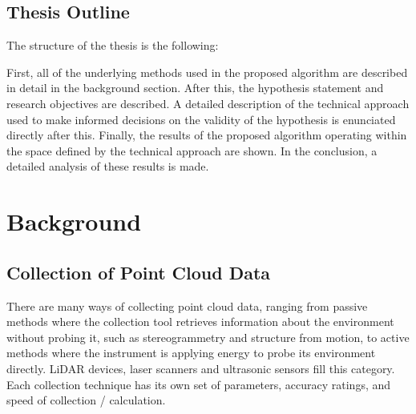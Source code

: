 \documentclass[12pt]{drexelthesis}
\let\Oldsection\section
\renewcommand{\section}{\FloatBarrier\Oldsection}
\begin{document}
\section{Thesis Outline}

The structure of the thesis is the following:

First, all of the underlying methods used in the proposed algorithm are described in detail in the background section. After this, the hypothesis statement and research objectives are described. A detailed description of the technical approach used to make informed decisions on the validity of the hypothesis is enunciated directly after this. Finally, the results of the proposed algorithm operating within the space defined by the technical approach are shown. In the conclusion, a detailed analysis of these results is made.
















\chapter{Background}
\label{chap:background}
\section{Collection of Point Cloud Data}
\label{sec:PCcollection}
There are many ways of collecting point cloud data, ranging from passive methods where the collection tool retrieves information about the environment without probing it, such as stereogrammetry and structure from motion, to active methods where the instrument is applying energy to probe its environment directly. LiDAR devices, laser scanners and ultrasonic sensors fill this category. Each collection technique has its own set of parameters, accuracy ratings, and speed of collection / calculation.
\end{document}

